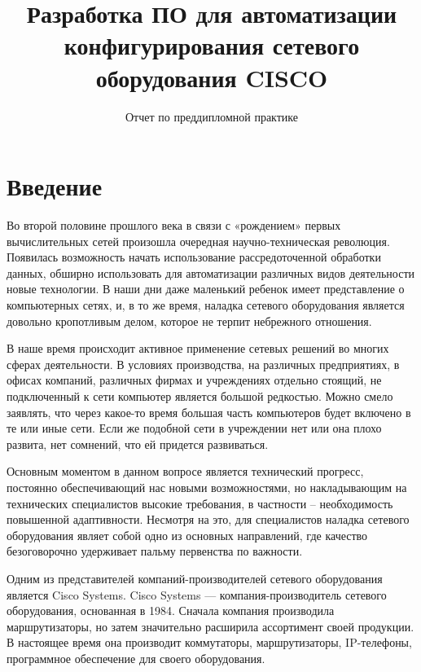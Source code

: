 \documentclass[a4paper,14pt]{extreport}
\begin{document}
	\title{Разработка ПО для автоматизации конфигурирования сетевого оборудования CISCO}
	\subtitle{Отчет по преддипломной практике}
	\maketitle
	\setcounter{page}{2} %
	
	\tableofcontents
	
	\chapter*{Введение}
	
	Во второй половине прошлого века в связи с «рождением» первых
	вычислительных сетей произошла очередная научно-техническая революция. Появилась возможность начать использование рассредоточенной
	обработки данных, обширно использовать для автоматизации различных
	видов деятельности новые технологии. В наши дни даже маленький ребенок имеет представление о компьютерных сетях, и, в то же время,
	наладка сетевого оборудования является довольно кропотливым делом,
	которое не терпит небрежного отношения.
	
	В наше время происходит активное применение сетевых решений во многих сферах деятельности. В условиях производства, на различных предприятиях,
	в офисах компаний, различных фирмах и учреждениях отдельно стоящий, не подключенный к сети компьютер является большой редкостью. Можно смело заявлять, что через какое-то время
	большая часть компьютеров будет включено в те или иные сети. Если же
	подобной сети в учреждении нет или она плохо развита, нет сомнений,
	что ей придется развиваться.
	
	Основным моментом в данном вопросе является технический прогресс, постоянно обеспечивающий нас новыми возможностями, но накладывающим на технических специалистов высокие требования, в частности – необходимость повышенной адаптивности. Несмотря на это,
	для специалистов наладка сетевого оборудования являет собой одно из
	основных направлений, где качество безоговорочно удерживает пальму
	первенства по важности.
	
	Одним из представителей компаний-производителей сетевого оборудования является Cisco Systems. Cisco Systems — компания-производитель
	сетевого оборудования, основанная в 1984. Сначала компания производила маршрутизаторы, но затем значительно расширила ассортимент своей продукции. В настоящее время она производит коммутаторы, маршрутизаторы,
	IP-телефоны, программное обеспечение для своего оборудования.
	
\end{document}
